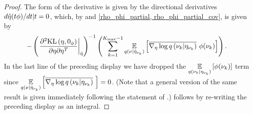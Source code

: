 \begin{thm}
\begin{proof}
The form of the derivative is given by the directional derivatives $d \hat\eta(t
\phi) / dt | t = 0$, which, by  and \eqref{rho_phi_partial,
rho_phi_partial_cov}, is given by
%
\begin{align*}
%
-\left(\fracat{\partial^2 \KL{\eta, \phiz}}
                {\partial \eta \partial \eta^T}
                {\etaopt}\right)^{-1}
\left(
    \sumkm \expect{\q(\nu \vert \etaoptnuk)}
                  {\lqgradbar{\nuk \vert \etanuk}
                   \phi(\nuk) }
\right).
%
\end{align*}
%
In the last line of the preceding display we have dropped the $\underset{q(\nu_{k}
\vert \eta_{\nu_{k}})}{\mathbb{E}}\left[\phi(\nu_{k})\right]$ term since $\underset{q(\nu \vert \hat\eta_{\nu_{k}})}{\mathbb{E}}\left[\overline{{\nabla_\eta \log q}\left(\nu_{k} \vert \eta_{\nu_{k}}\right)}\,\,\right] = 0$.  (Note that a general version of the
same result is given immediately following the statement of \citet[Theorem
4.B(c)]{zeidler:2013:functional}.)   follows by
re-writing the preceding display as an integral.
%
\end{proof}
%
\end{thm}
%
